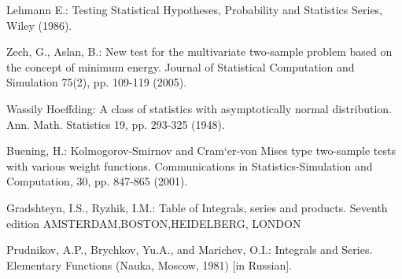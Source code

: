 \documentclass{svproc}
\begin{document}
\begin{thebibliography}{6}

Lehmann E.: Testing  Statistical  Hypotheses,  Probability  and  Statistics  Series,  Wiley (1986).

Zech, G., Aslan, B.: New test for the multivariate two-sample problem based on the concept of minimum energy. Journal of Statistical Computation and Simulation 75(2), pp. 109-119 (2005).

Wassily Hoeffding: A class of statistics with asymptotically normal distribution. Ann. Math. Statistics 19, pp. 293-325 (1948).

Buening, H.: Kolmogorov-Smirnov and Cram`er-von Mises type two-sample tests with various weight functions. Communications in Statistics-Simulation and Computation, 30, pp. 847-865 (2001).

Gradshteyn, I.S., Ryzhik, I.M.: Table of Integrals, series and products. Seventh edition AMSTERDAM,BOSTON,HEIDELBERG, LONDON

Prudnikov, A.P., Brychkov, Yu.A., and Marichev, O.I.: Integrals and Series. Elementary Functions (Nauka, Moscow, 1981) [in Russian].

\end{thebibliography}
\end{document}
